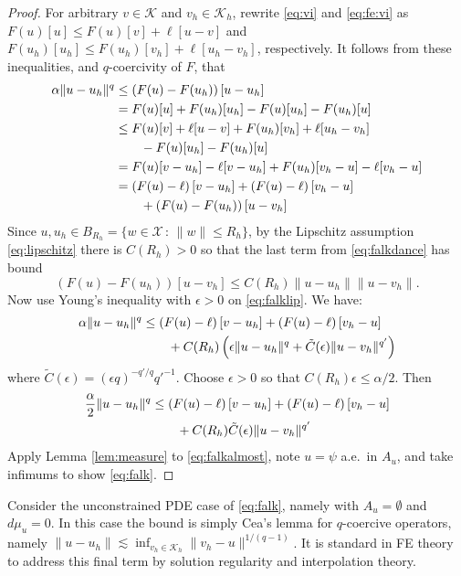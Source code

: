 \documentclass[]{interact}
\theoremstyle{plain}%
\theoremstyle{definition}
\theoremstyle{remark}
\newcommand{\eps}{\epsilon}
\newcommand{\cK}{\mathcal{K}}
\newcommand{\cX}{\mathcal{X}}
\begin{document}
\begin{proof}  For arbitrary $v\in\cK$ and $v_h\in\cK_h$, rewrite \eqref{eq:vi} and \eqref{eq:fe:vi} as $F(u)[u] \le F(u)[v] + \ell[u-v]$ and $F(u_h)[u_h] \le F(u_h)[v_h] + \ell[u_h-v_h]$, respectively.  It follows from these inequalities, and $q$-coercivity of $F$, that
\begin{align}
\alpha \|u-u_h\|^q &\le \left(F(u)-F(u_h)\right)[u-u_h] \label{eq:falkdance} \\
  &= F(u)[u] + F(u_h)[u_h] - F(u)[u_h] - F(u_h)[u] \notag \\
  &\le F(u)[v] + \ell[u-v] + F(u_h)[v_h] + \ell[u_h-v_h] \notag \\
  &\qquad - F(u)[u_h] - F(u_h)[u] \notag \\
  &= F(u)[v-u_h] - \ell[v-u_h] + F(u_h)[v_h-u] - \ell[v_h-u] \notag \\
  &= \left(F(u)-\ell\right)[v-u_h] + \left(F(u)-\ell\right)[v_h-u] \notag \\
  &\qquad + \left(F(u)-F(u_h)\right)[u-v_h] \notag
\end{align}
Since $u,u_h\in B_{R_h} = \{w\in\cX\,:\,\|w\|\le R_h\}$, by the Lipschitz assumption \eqref{eq:lipschitz} there is $C(R_h)>0$ so that the last term from \eqref{eq:falkdance} has bound
\begin{equation}
\left(F(u)-F(u_h)\right)[u-v_h] \le C(R_h) \|u-u_h\|\|u-v_h\|. \label{eq:falklip}
\end{equation}
Now use Young's inequality with $\eps>0$ \cite[Appendix B.2]{Evans2010} on \eqref{eq:falklip}.  We have:
\begin{align}
\alpha \|u-u_h\|^q &\le \left(F(u)-\ell\right)[v-u_h] + \left(F(u)-\ell\right)[v_h-u]  \label{eq:falkyoung} \\
  &\qquad + C(R_h) \left(\eps\|u-u_h\|^q + \tilde C(\eps) \|u-v_h\|^{q'}\right) \notag
\end{align}
where $\tilde C(\eps) = (\eps q)^{-q'/q} {q'}^{-1}$.  Choose $\eps>0$ so that $C(R_h) \eps \le \alpha/2$.  Then
\begin{align}
\frac{\alpha}{2} \|u-u_h\|^q &\le \left(F(u)-\ell\right)[v-u_h] + \left(F(u)-\ell\right)[v_h-u]  \label{eq:falkalmost} \\
  &\qquad + C(R_h) \tilde C(\eps) \|u-v_h\|^{q'} \notag
\end{align}
Apply Lemma \ref{lem:measure} to \eqref{eq:falkalmost}, note $u=\psi$ a.e.~in $A_u$, and take infimums to show \eqref{eq:falk}.\end{proof}

Consider the unconstrained PDE case of \eqref{eq:falk}, namely with $A_u=\emptyset$ and $d\mu_u=0$.  In this case the bound is simply Cea's lemma for $q$-coercive operators, namely $\|u-u_h\| \lesssim \inf_{v_h\in\cK_h} \|v_h - u\|^{1/(q-1)}$.  It is standard in FE theory \cite{AinsworthOden2000,ElmanSilvesterWathen2014} to address this final term by solution regularity and interpolation theory.
\end{document}
